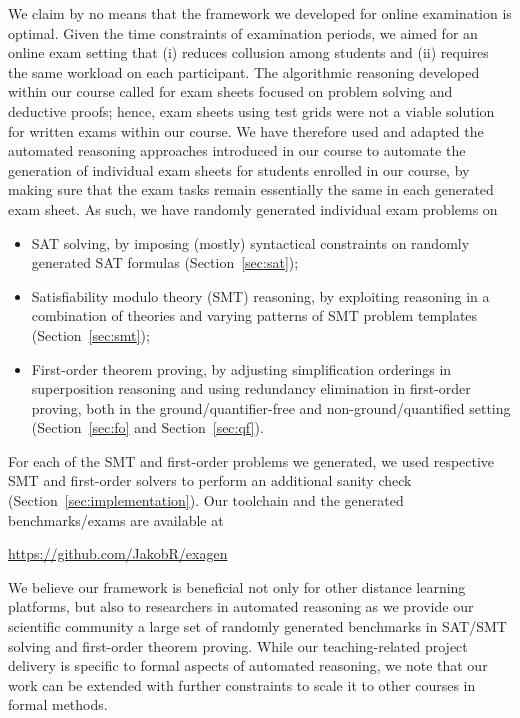 We claim by no means that the framework we developed for online
examination is optimal.
Given the time constraints of examination periods, we aimed for an
online exam setting that (i) reduces collusion among students and  (ii)
requires the same workload on each participant.
The algorithmic reasoning developed within our
course called for exam sheets focused on problem solving and deductive
proofs; hence, exam sheets using test grids were not a viable solution
for written exams within our course.
We have therefore used and adapted the automated reasoning approaches introduced in our
course to automate the generation of individual exam sheets for
students enrolled in our course, by making sure that the exam tasks
remain essentially the same in each generated exam sheet. As such, we have randomly generated
individual exam problems on 
\begin{itemize}
\item
    SAT solving, by imposing (mostly) syntactical constraints on
    randomly generated SAT formulas (Section~\ref{sec:sat});
    
\item Satisfiability modulo theory (SMT) reasoning, by exploiting reasoning in a combination of theories
  and varying patterns of SMT problem templates
  (Section~\ref{sec:smt});
  
\item First-order theorem proving, by adjusting simplification
  orderings in superposition reasoning and using redundancy elimination
  in first-order proving, both in the ground/quantifier-free 
  and non-ground/quantified setting (Section~\ref{sec:fo}
  and Section~\ref{sec:qf}). 
\end{itemize}

For each of the SMT and first-order problems we generated, we used respective
SMT and first-order solvers to perform an additional sanity check
(Section~\ref{sec:implementation}).
Our toolchain and the generated benchmarks/exams are available at

\begin{center}
  \url{https://github.com/JakobR/exagen}
\end{center}

We believe our framework is beneficial not only for other
distance learning platforms, but also to researchers in automated
reasoning as we provide our scientific community
a large set of randomly generated benchmarks in SAT/SMT solving and first-order theorem proving.
While our teaching-related project delivery is specific to formal aspects of automated
reasoning, we note that our work can be extended with further
constraints to scale it to other courses in formal methods. 

